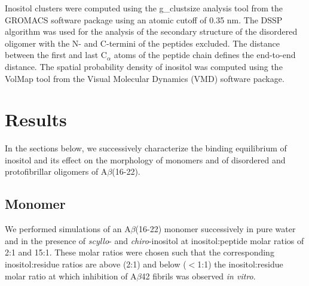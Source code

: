 Inositol clusters were computed using the g\_clustsize analysis tool from the GROMACS software package using an atomic cutoff of 0.35 nm. The DSSP algorithm was used for the analysis of the secondary structure of the disordered oligomer with the N- and C-termini of the peptides excluded. The distance between the first and last C$_{\alpha}$ atoms of the peptide chain defines the end-to-end distance. The spatial probability density of inositol was computed using the VolMap tool from the Visual Molecular Dynamics (VMD) software package.\cite{Humphrey:1996p850}

\section{Results}

In the sections below, we successively characterize the binding equilibrium of inositol and its effect on the morphology of monomers and of disordered and protofibrillar oligomers of A$\beta$(16-22).

\subsection{Monomer}

We performed simulations of an A$\beta$(16-22) monomer successively in pure water and in the presence of \emph{scyllo}- and \emph{chiro}-inositol at inositol:peptide molar ratios of 2:1 and 15:1.  These molar ratios were chosen such that the corresponding inositol:residue ratios are above (2:1) and below ($<$1:1) the inositol:residue molar ratio at which inhibition of A$\beta$42 fibrils was observed \emph{in vitro}.\cite{McLaurin:2000p64}

